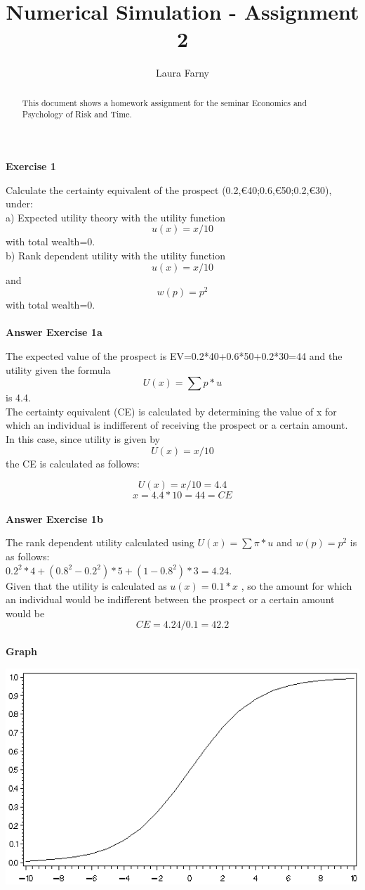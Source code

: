 \documentclass[12pt]{article}
\begin{document}
	
\title{Numerical Simulation - Assignment 2}
\author{Laura Farny}

{}


\begin{abstract}
	This document shows a homework assignment for the seminar Economics and Psychology of Risk and Time.
	
\end{abstract}

\textbf {Exercise 1\\}

Calculate the certainty equivalent of the prospect (0.2,€40;0.6,€50;0.2,€30), under: \\
a) Expected utility theory with the utility function \[u(x) =x/10\] with total wealth=0. \\
b) Rank dependent utility with the utility function \[u(x) =x/10\] and \[w(p) = p^{2}\] with total wealth=0. \\
\\


\textbf {Answer Exercise 1a\\}

The expected value of the prospect is EV=0.2*40+0.6*50+0.2*30=44 and the utility given the formula \[U(x)=\sum p*u\] is 4.4.\\
The certainty equivalent (CE) is calculated by determining the value of x for which an individual is indifferent of receiving the prospect or a certain amount. In this case, since utility is given by \[U(x)=x/10\]  the CE is calculated as follows:

\[U(x)=x/10 =4.4\]
\[x=4.4*10=44=CE\]\\


\textbf {Answer Exercise 1b\\}

The rank dependent utility calculated using \(U(x)=\sum \pi *u\) and \(w(p)=p^{2}\) is as follows: \\
\(0.2^{2}*4 + (0.8^{2}-0.2^{2})*5 + (1-0.8^{2})*3 = 4.24\). \\
Given that the utility is calculated as \(u(x)=0.1*x\) , so the amount for which an individual would be indifferent between the prospect or a certain amount would be \[CE=4.24/0.1=42.2\]\\

\textbf {Graph\\}

\includegraphics{graph}
\end{document}
